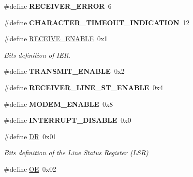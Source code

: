 \begin{DoxyCompactItemize}
\mbox{\label{group__i386__uart_ga36580c4f4f6f9b989ba2f94d660f83f5}} 
\#define {\bfseries R\+E\+C\+E\+I\+V\+E\+R\+\_\+\+E\+R\+R\+OR}~6
\item 
\mbox{\label{group__i386__uart_ga94569250a59ce73e6f6c64329c64aae5}} 
\#define {\bfseries C\+H\+A\+R\+A\+C\+T\+E\+R\+\_\+\+T\+I\+M\+E\+O\+U\+T\+\_\+\+I\+N\+D\+I\+C\+A\+T\+I\+ON}~12
\item 
\mbox{\label{group__i386__uart_ga66b1dc1805a0996158b7176e637c46ee}} 
\#define \mbox{\hyperlink{group__i386__uart_ga66b1dc1805a0996158b7176e637c46ee}{R\+E\+C\+E\+I\+V\+E\+\_\+\+E\+N\+A\+B\+LE}}~0x1
\begin{DoxyCompactList}\small\item\em Bits definition of I\+ER. \end{DoxyCompactList}\item 
\mbox{\label{group__i386__uart_ga1e87a828223641b158bfe69ad076cba4}} 
\#define {\bfseries T\+R\+A\+N\+S\+M\+I\+T\+\_\+\+E\+N\+A\+B\+LE}~0x2
\item 
\mbox{\label{group__i386__uart_ga94ce03d0a2c32f7bf075578d490c0a23}} 
\#define {\bfseries R\+E\+C\+E\+I\+V\+E\+R\+\_\+\+L\+I\+N\+E\+\_\+\+S\+T\+\_\+\+E\+N\+A\+B\+LE}~0x4
\item 
\mbox{\label{group__i386__uart_ga4d120b2c95d9e7ff575a5d12077f481a}} 
\#define {\bfseries M\+O\+D\+E\+M\+\_\+\+E\+N\+A\+B\+LE}~0x8
\item 
\mbox{\label{group__i386__uart_ga658c3ad175b50000ac44b3b9ea836d1a}} 
\#define {\bfseries I\+N\+T\+E\+R\+R\+U\+P\+T\+\_\+\+D\+I\+S\+A\+B\+LE}~0x0
\item 
\#define \mbox{\hyperlink{group__i386__uart_ga349dad5e520932e840e6f8fc806bd94d}{DR}}~0x01
\begin{DoxyCompactList}\small\item\em Bits definition of the Line Status Register (L\+SR) \end{DoxyCompactList}\item 
\mbox{\label{group__i386__uart_ga7122a6e5d75b5f8b7f00c7130df40407}} 
\#define \mbox{\hyperlink{group__i386__uart_ga7122a6e5d75b5f8b7f00c7130df40407}{OE}}~0x02

\end{DoxyCompactItemize}
